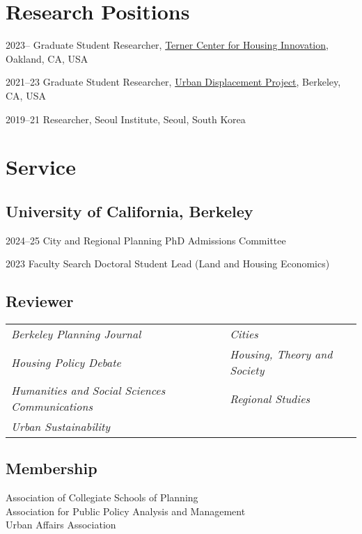 \documentclass[11pt,letterpaper]{article}
\begin{document}
\section{Research Positions}
\begin{tablist}
  \item[2023– ] \tab{}Graduate Student Researcher, \href{https://ternercenter.berkeley.edu/}{Terner Center for Housing Innovation}, Oakland, CA, USA
  \item[2021–23] \tab{}Graduate Student Researcher, \href{https://www.urbandisplacement.org/}{Urban Displacement Project}, Berkeley, CA, USA
  \item[2019–21] \tab{}Researcher, Seoul Institute, Seoul, South Korea
\end{tablist}

\section{Service}

\subsection{University of California, Berkeley}
\begin{tablist}
  \item[2024–25] \tab{}City and Regional Planning PhD Admissions Committee
  \item[2023] \tab{}Faculty Search Doctoral Student Lead (Land and Housing Economics)
\end{tablist}

\subsection{Reviewer}
\begin{tabular}{@{}p{} p{}@{}}
\emph{Berkeley Planning Journal} & \emph{Cities}\\
\emph{Housing Policy Debate} & \emph{Housing, Theory and Society}\\
\emph{Humanities and Social Sciences Communications} & \emph{Regional Studies}\\
\emph{Urban Sustainability} &
\end{tabular}

\subsection{Membership}
Association of Collegiate Schools of Planning\\
Association for Public Policy Analysis and Management\\
Urban Affairs Association
\end{document}
